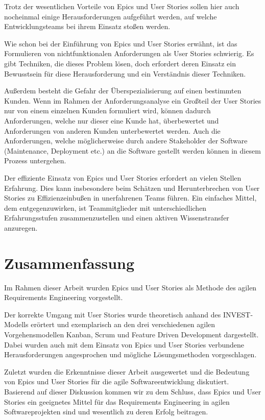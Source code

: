 \documentclass[acmtog]{acmart}
\begin{document}
Trotz der wesentlichen Vorteile von Epics und User Stories sollen hier auch nocheinmal einige Herausforderungen aufgeführt
werden, auf welche Entwicklungsteams bei ihrem Einsatz stoßen werden.

Wie schon bei der Einführung von Epics und User Stories erwähnt, ist das Formulieren von nichtfunktionalen Anforderungen als User Stories
schwierig. Es gibt Techniken, die dieses Problem lösen, doch erfordert deren Einsatz ein Bewusstsein für diese Herausforderung und ein Verständnis dieser Techniken.

Außerdem besteht die Gefahr der Überspezialisierung auf einen bestimmten Kunden.
Wenn im Rahmen der Anforderungsanalyse ein Großteil der User Stories nur von einem einzelnen Kunden formuliert wird,
können dadurch Anforderungen, welche nur dieser eine Kunde hat, überbewertet und Anforderungen von anderen Kunden unterbewertet werden.
Auch die Anforderungen, welche möglicherweise durch andere Stakeholder der Software (Maintenance, Deployment etc.) an die Software gestellt werden
können in diesem Prozess untergehen.

Der effiziente Einsatz von Epics und User Stories erfordert an vielen Stellen Erfahrung.
Dies kann insbesondere beim Schätzen und Herunterbrechen von User Stories zu Effizienzeinbußen
in unerfahrenen Teams führen. Ein einfaches Mittel, dem entgegenzuwirken, ist Teammitglieder mit unterschiedlichen
Erfahrungsstufen zusammenzustellen und einen aktiven Wissenstransfer anzuregen.

\section{Zusammenfassung} \label{sec:zusammenfassung}
Im Rahmen dieser Arbeit wurden Epics und User Stories als Methode des agilen Requirements Engineering vorgestellt.

Der korrekte Umgang mit User Stories wurde theoretisch anhand des INVEST-Modells erörtert und exemplarisch
an den drei verschiedenen agilen Vorgehensmodellen Kanban, Scrum und Feature Driven Development dargestellt.
Dabei wurden auch mit dem Einsatz von Epics und User Stories verbundene Herausforderungen angesprochen und mögliche
Lösungsmethoden vorgeschlagen.

Zuletzt wurden die Erkenntnisse dieser Arbeit ausgewertet und die Bedeutung von Epics und User Stories für die agile Softwareentwicklung
diskutiert.
Basierend auf dieser Diskussion kommen wir zu dem Schluss, dass Epics und User Stories ein geeignetes Mittel für das
Requirements Engineering in agilen Softwareprojekten sind und wesentlich zu deren Erfolg beitragen.
\end{document}
